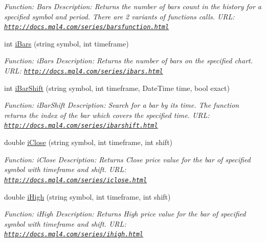 \begin{DoxyCompactItemize}
\begin{DoxyCompactList}\small\item\em Function\+: Bars Description\+: Returns the number of bars count in the history for a specified symbol and period. There are 2 variants of functions calls. U\+RL\+: \href{http://docs.mql4.com/series/barsfunction.html}{\tt http\+://docs.\+mql4.\+com/series/barsfunction.\+html} \end{DoxyCompactList}\item 
int \hyperlink{class_m_q_l4_c_sharp_1_1_base_1_1_m_q_l_base_a0d1e117178d2cd1011a477059060622e}{i\+Bars} (string symbol, int timeframe)
\begin{DoxyCompactList}\small\item\em Function\+: i\+Bars Description\+: Returns the number of bars on the specified chart. U\+RL\+: \href{http://docs.mql4.com/series/ibars.html}{\tt http\+://docs.\+mql4.\+com/series/ibars.\+html} \end{DoxyCompactList}\item 
int \hyperlink{class_m_q_l4_c_sharp_1_1_base_1_1_m_q_l_base_aeb441ae44cf230ccab01a0ac2ca4878b}{i\+Bar\+Shift} (string symbol, int timeframe, Date\+Time time, bool exact)
\begin{DoxyCompactList}\small\item\em Function\+: i\+Bar\+Shift Description\+: Search for a bar by its time. The function returns the index of the bar which covers the specified time. U\+RL\+: \href{http://docs.mql4.com/series/ibarshift.html}{\tt http\+://docs.\+mql4.\+com/series/ibarshift.\+html} \end{DoxyCompactList}\item 
double \hyperlink{class_m_q_l4_c_sharp_1_1_base_1_1_m_q_l_base_ae30b58e6a4da538a3c30800306dd30d9}{i\+Close} (string symbol, int timeframe, int shift)
\begin{DoxyCompactList}\small\item\em Function\+: i\+Close Description\+: Returns Close price value for the bar of specified symbol with timeframe and shift. U\+RL\+: \href{http://docs.mql4.com/series/iclose.html}{\tt http\+://docs.\+mql4.\+com/series/iclose.\+html} \end{DoxyCompactList}\item 
double \hyperlink{class_m_q_l4_c_sharp_1_1_base_1_1_m_q_l_base_a6b30fe2b74319f6e25b67aca27763f75}{i\+High} (string symbol, int timeframe, int shift)
\begin{DoxyCompactList}\small\item\em Function\+: i\+High Description\+: Returns High price value for the bar of specified symbol with timeframe and shift. U\+RL\+: \href{http://docs.mql4.com/series/ihigh.html}{\tt http\+://docs.\+mql4.\+com/series/ihigh.\+html} \end{DoxyCompactList}\item 

\end{DoxyCompactItemize}
